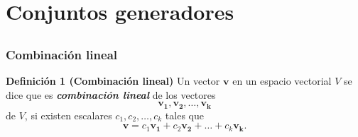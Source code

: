 \section{Conjuntos generadores}

\subsection{}

\begin{frame}\frametitle{Combinación lineal}

\begin{block}{\textbf{Definición 1 (Combinación lineal)}}
	\justifying
	Un vector $\mathbf{v}$ en un espacio vectorial $V$ se dice que es \textbf{\textit{combinación lineal}} 
	de los vectores
	\[
		\mathbf{v_1}, \mathbf{v_2}, \hdots, \mathbf{v_k}
	\]
	de $V$, si existen escalares $c_1,c_2, \hdots,c_k$ tales que
	\[
		\mathbf{v} = c_1\mathbf{v_1} + c_2\mathbf{v_2} + \hdots + c_k\mathbf{v_k}.
	\]
\end{block}

%


\end{frame}


\subsection{}

